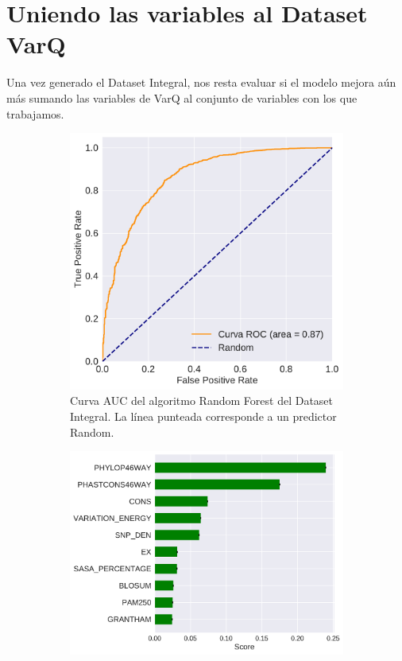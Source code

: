 \section{Uniendo las variables al Dataset VarQ}

Una vez generado el Dataset Integral, nos resta evaluar si el modelo mejora aún más sumando las variables de VarQ al conjunto de variables con los que trabajamos.

\pagebreak

\begin{figure}[H]
\centering
\begin{subfigure}[b]{0.8\textwidth}
    \centering
    \includegraphics[width=\textwidth]{documents/latex/figures/3/integral_varq/auc_varq_integral.pdf}
    \caption{Curva AUC del algoritmo Random Forest del Dataset Integral. La línea punteada corresponde a un predictor Random.}
    \label{fig:auc_integral_varq}
\end{subfigure}
\hfill
\hfill
\begin{subfigure}[b]{0.9\textwidth}
    \centering
    \includegraphics[width=\textwidth]{documents/latex/figures/3/integral_varq/importances_varq_integral.pdf}

\end{subfigure}
\end{figure}
